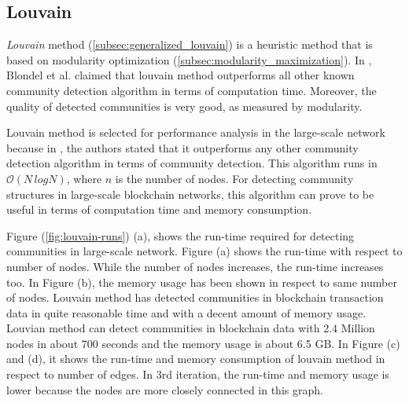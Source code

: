 \subsection{Louvain}
\textit{Louvain} method (\ref{subsec:generalized_louvain}) is a heuristic method that is based on modularity optimization (\ref{subsec:modularity_maximization}). In \cite{ref-27}, Blondel et al. claimed that louvain method outperforms all other known community detection algorithm in terms of computation time. Moreover, the quality of detected communities is very good, as measured by modularity.

Louvain method is selected for performance analysis in the large-scale network because in \cite{ref-27}, the authors stated that it outperforms any other community detection algorithm in terms of community detection. This algorithm runs in $\mathcal{O}(N \, log N)$, where $n$ is the number of nodes. For detecting community structures in large-scale blockchain networks, this algorithm can prove to be useful in terms of computation time and memory consumption.

Figure (\ref{fig:louvain-runs}) (a), shows the run-time required for detecting communities in large-scale network. Figure (a) shows the run-time with respect to number of nodes. While the number of nodes increases, the run-time increases too. In Figure (b), the memory usage has been shown in respect to same number of nodes. Louvain method has detected communities in blockchain transaction data in quite reasonable time and with a decent amount of memory usage. Louvian method can detect communities in blockchain data with 2.4 Million nodes in about 700 seconds and the memory usage is about 6.5 GB. In Figure (c) and (d), it shows the run-time and memory consumption of louvain method in respect to number of edges. In 3rd iteration, the run-time and memory usage is lower because the nodes are more closely connected in this graph.

